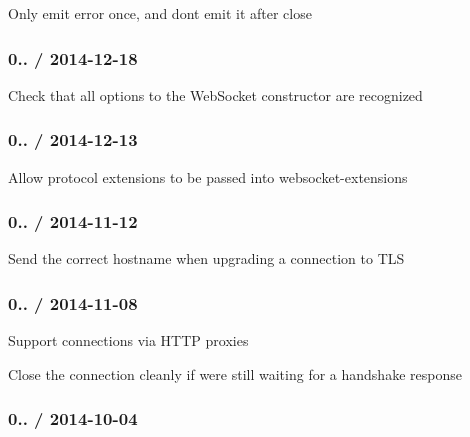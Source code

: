 \begin{DoxyItemize}
\item Only emit {\ttfamily error} once, and don\textquotesingle{}t emit it after {\ttfamily close}
\end{DoxyItemize}

\subsubsection*{0.. / 2014-\/12-\/18}


\begin{DoxyItemize}
\item Check that all options to the Web\+Socket constructor are recognized
\end{DoxyItemize}

\subsubsection*{0.. / 2014-\/12-\/13}


\begin{DoxyItemize}
\item Allow protocol extensions to be passed into websocket-\/extensions
\end{DoxyItemize}

\subsubsection*{0.. / 2014-\/11-\/12}


\begin{DoxyItemize}
\item Send the correct hostname when upgrading a connection to T\+LS
\end{DoxyItemize}

\subsubsection*{0.. / 2014-\/11-\/08}


\begin{DoxyItemize}
\item Support connections via H\+T\+TP proxies
\item Close the connection cleanly if we\textquotesingle{}re still waiting for a handshake response
\end{DoxyItemize}

\subsubsection*{0.. / 2014-\/10-\/04}


